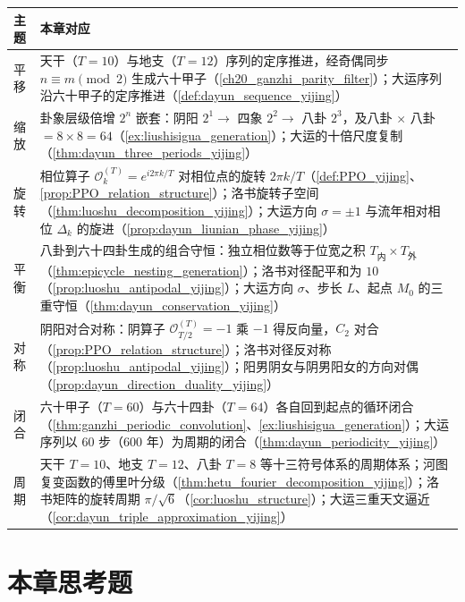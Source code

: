 \begin{center}
\renewcommand{\arraystretch}{1.3}
\begin{tabular}{>{\centering\arraybackslash}p{2.2cm}>{\centering\arraybackslash}p{10.5cm}}
\toprule
主题 & 本章对应 \\
\midrule
平移 & 天干（$T=10$）与地支（$T=12$）序列的定序推进，经奇偶同步 $n \equiv m \pmod 2$ 生成六十甲子（\cref{ch20_ganzhi_parity_filter}）；大运序列沿六十甲子的定序推进（\cref{def:dayun_sequence_yijing}） \\
缩放 & 卦象层级倍增 $2^n$ 嵌套：阴阳 $2^1 \to$ 四象 $2^2 \to$ 八卦 $2^3$，及八卦 $\times$ 八卦 $= 8 \times 8 = 64$（\cref{ex:liushisigua_generation}）；大运的十倍尺度复制（\cref{thm:dayun_three_periods_yijing}） \\
旋转 & 相位算子 $\mathcal{O}_k^{(T)} = e^{i2\pi k/T}$ 对相位点的旋转 $2\pi k/T$（\cref{def:PPO_yijing}、\cref{prop:PPO_relation_structure}）；洛书旋转子空间（\cref{thm:luoshu_decomposition_yijing}）；大运方向 $\sigma=\pm 1$ 与流年相对相位 $\Delta_k$ 的旋进（\cref{prop:dayun_liunian_phase_yijing}） \\
平衡 & 八卦到六十四卦生成的组合守恒：独立相位数等于位宽之积 $T_{\text{内}} \times T_{\text{外}}$（\cref{thm:epicycle_nesting_generation}）；洛书对径配平和为 $10$（\cref{prop:luoshu_antipodal_yijing}）；大运方向 $\sigma$、步长 $L$、起点 $M_0$ 的三重守恒（\cref{thm:dayun_conservation_yijing}） \\
对称 & 阴阳对合对称：阴算子 $\mathcal{O}_{T/2}^{(T)} = -1$ 乘 $-1$ 得反向量，$C_2$ 对合（\cref{prop:PPO_relation_structure}）；洛书对径反对称（\cref{prop:luoshu_antipodal_yijing}）；阳男阴女与阴男阳女的方向对偶（\cref{prop:dayun_direction_duality_yijing}） \\
闭合 & 六十甲子（$T=60$）与六十四卦（$T=64$）各自回到起点的循环闭合（\cref{thm:ganzhi_periodic_convolution}、\cref{ex:liushisigua_generation}）；大运序列以 $60$ 步（$600$ 年）为周期的闭合（\cref{thm:dayun_periodicity_yijing}） \\
周期 & 天干 $T=10$、地支 $T=12$、八卦 $T=8$ 等十三符号体系的周期体系；河图复变函数的傅里叶分级（\cref{thm:hetu_fourier_decomposition_yijing}）；洛书矩阵的旋转周期 $\pi/\sqrt{6}$（\cref{cor:luoshu_structure}）；大运三重天文逼近（\cref{cor:dayun_triple_approximation_yijing}） \\
\bottomrule
\end{tabular}
\end{center}

\section*{本章思考题}

